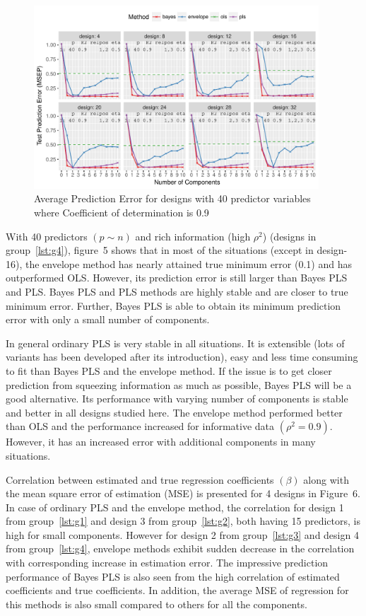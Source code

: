 \documentclass[num-refs]{wiley-article}
\begin{document}
\begin{figure}[!hptb]
\centering
\includegraphics[width = 0.95\textwidth]{prediction-error-40-2.pdf}
\caption[Prediction Error - 4]{Average Prediction Error for designs with 40 predictor
variables where Coefficient of determination is 0.9}
\label{fig:pred-error-40-2}
\end{figure}

With 40 predictors $(p\sim n)$ and rich information (high $\rho^2$) (designs in group~\ref{lst:g4}), figure~5 shows that in most of the situations (except in design-16), the envelope method has nearly attained true minimum error (0.1) and has outperformed OLS. However, its prediction error is still larger than Bayes PLS and PLS. Bayes PLS and PLS methods are highly stable and are closer to true minimum error.  Further, Bayes PLS is able to obtain its minimum prediction error with only a small number of components.

In general ordinary PLS is very stable in all situations. It is extensible (lots of variants has been developed after its introduction), easy and less time consuming to fit than Bayes PLS and the envelope method. If the issue is to get closer prediction from squeezing information as much as possible, Bayes PLS will be a good alternative. Its performance with varying number of components is stable and better in all designs studied here. The envelope method performed better than OLS and the performance increased for informative data $(\rho^2 = 0.9)$. However, it has an increased error with additional components in many situations.

Correlation between estimated and true regression coefficients $(\beta)$ along with the mean square error of estimation (MSE) is presented for 4 designs in Figure~6. In case of ordinary PLS and the envelope method, the correlation for design 1 from group~\ref{lst:g1} and design 3 from group~\ref{lst:g2}, both having 15 predictors, is high for small components. However for design 2 from group~\ref{lst:g3} and design 4 from group~\ref{lst:g4}, envelope methods exhibit sudden decrease in the correlation with corresponding increase in estimation error. The impressive prediction performance of Bayes PLS is also seen from the high correlation of estimated coefficients and true coefficients. In addition, the average MSE of regression for this methods is also small compared to others for all the components.
\end{document}
